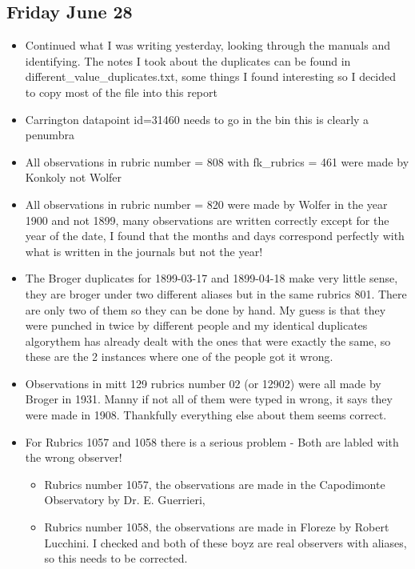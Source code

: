 \documentclass[12pt]{article}
\begin{document}
\subsection{Friday June 28} 
\begin{itemize}
    \item Continued what I was writing yesterday, looking through the manuals and identifying. The notes I took about the duplicates can be found in different\_value\_duplicates.txt, some things I found interesting so I decided to copy most of the file into this report
    \item Carrington datapoint id=31460 needs to go in the bin this is clearly a penumbra
    \item All observations in rubric number = 808 with fk\_rubrics = 461 were made by Konkoly not Wolfer
    \item All observations in rubric number = 820 were made by Wolfer in the year 1900 and not 1899, many observations are written correctly except for the year of the date, I found that the months and days correspond perfectly with what is written in the journals but not the year!
    \item The Broger duplicates for 1899-03-17 and 1899-04-18 make very little sense, they are broger under two different aliases but in the same rubrics 801. There are only two of them so they can be done by hand. My guess is that they were punched in twice by different people and my identical duplicates algorythem has already dealt with the ones that were exactly the same, so these are the 2 instances where one of the people got it wrong.
    \item Observations in mitt 129 rubrics number 02 (or 12902) were all made by Broger in 1931. Manny if not all of them were typed in wrong, it says they were made in 1908. Thankfully everything else about them seems correct.
    \item For Rubrics 1057 and 1058 there is a serious problem - Both are labled with the wrong observer! 
    \begin{itemize}
        \item Rubrics number 1057, the observations are made in the Capodimonte Observatory by Dr. E. Guerrieri,
        \item Rubrics number 1058, the observations are made in Floreze by Robert Lucchini. I checked and both of these boyz are real observers with aliases, so this needs to be corrected.

\end{itemize}
\end{itemize}
\end{document}
